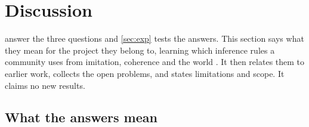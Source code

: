 \section{Discussion}\label{sec:disc}

 answer the three questions and \cref{sec:exp} tests the answers. This section says
what they mean for the project they belong to, learning which inference rules a community uses from imitation,
coherence and the world \citep{claude2026whatfollows}. It then relates them to earlier work, collects the open
problems, and states limitations and scope. It claims no new results.

\subsection{What the answers mean}\label{sec:disc:meaning}

